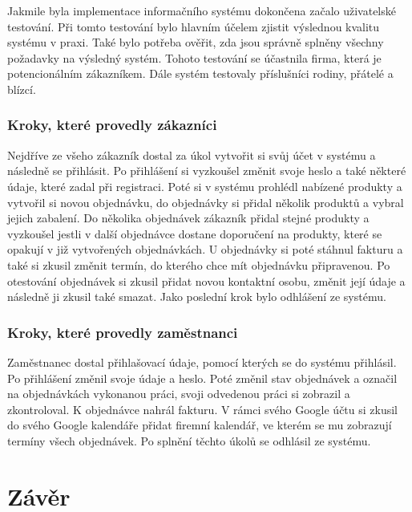 Jakmile byla implementace informačního systému dokončena začalo uživatelské testování. Při tomto testování bylo hlavním účelem zjistit výslednou kvalitu systému v praxi. Také bylo potřeba ověřit, zda jsou správně splněny všechny požadavky na výsledný systém. Tohoto testování se účastnila firma, která je potencionálním zákazníkem. Dále systém testovaly příslušníci rodiny, přátelé a blízcí.

\subsection*{Kroky, které provedly zákazníci}

Nejdříve ze všeho zákazník dostal za úkol vytvořit si svůj účet v systému a následně se přihlásit. Po přihlášení si vyzkoušel změnit svoje heslo a také některé údaje, které zadal při registraci. Poté si v systému prohlédl nabízené produkty a vytvořil si novou objednávku, do objednávky si přidal několik produktů a vybral jejich zabalení. Do několika objednávek zákazník přidal stejné produkty a vyzkoušel jestli v další objednávce dostane doporučení na produkty, které se opakují v již vytvořených objednávkách. U objednávky si poté stáhnul fakturu a také si zkusil změnit termín, do kterého chce mít objednávku připravenou. Po otestování objednávek si zkusil přidat novou kontaktní osobu, změnit její údaje a následně ji zkusil také smazat. Jako poslední krok bylo odhlášení ze systému.

\subsection*{Kroky, které provedly zaměstnanci}

Zaměstnanec dostal přihlašovací údaje, pomocí kterých se do systému přihlásil. Po přihlášení změnil svoje údaje a heslo. Poté změnil stav objednávek a označil na objednávkách vykonanou práci, svoji odvedenou práci si zobrazil a zkontroloval. K objednávce nahrál fakturu. V rámci svého Google účtu si zkusil do svého Google kalendáře přidat firemní kalendář, ve kterém se mu zobrazují termíny všech objednávek. Po splnění těchto úkolů se odhlásil ze systému.


\chapter{Závěr}
\label{end}

